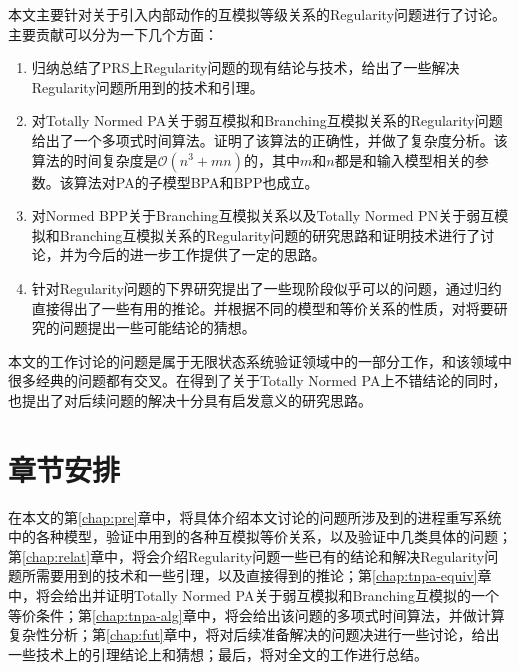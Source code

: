 本文主要针对关于引入内部动作的互模拟等级关系的Regularity问题进行了讨论。主要贡献可以分为一下几个方面：

\begin{enumerate}
	\item 归纳总结了PRS上Regularity问题的现有结论与技术，给出了一些解决Regularity问题所用到的技术和引理。
	\item 对Totally Normed PA关于弱互模拟和Branching互模拟关系的Regularity问题给出了一个多项式时间算法。证明了该算法的正确性，并做了复杂度分析。该算法的时间复杂度是$\mathscr{O}(n^3+mn)$的，其中$m$和$n$都是和输入模型相关的参数。该算法对PA的子模型BPA和BPP也成立。
	\item 对Normed BPP关于Branching互模拟关系以及Totally Normed PN关于弱互模拟和Branching互模拟关系的Regularity问题的研究思路和证明技术进行了讨论，并为今后的进一步工作提供了一定的思路。
	\item 针对Regularity问题的下界研究提出了一些现阶段似乎可以的问题，通过归约直接得出了一些有用的推论。并根据不同的模型和等价关系的性质，对将要研究的问题提出一些可能结论的猜想。
\end{enumerate}

本文的工作讨论的问题是属于无限状态系统验证领域中的一部分工作，和该领域中很多经典的问题都有交叉。在得到了关于Totally Normed PA上不错结论的同时，也提出了对后续问题的解决十分具有启发意义的研究思路。

\section{章节安排}
\label{sec:section}

在本文的第\ref{chap:pre}章中，将具体介绍本文讨论的问题所涉及到的进程重写系统中的各种模型，验证中用到的各种互模拟等价关系，以及验证中几类具体的问题；第\ref{chap:relat}章中，将会介绍Regularity问题一些已有的结论和解决Regularity问题所需要用到的技术和一些引理，以及直接得到的推论；第\ref{chap:tnpa-equiv}章中，将会给出并证明Totally Normed PA关于弱互模拟和Branching互模拟的一个等价条件；第\ref{chap:tnpa-alg}章中，将会给出该问题的多项式时间算法，并做计算复杂性分析；第\ref{chap:fut}章中，将对后续准备解决的问题决进行一些讨论，给出一些技术上的引理结论上和猜想；最后，将对全文的工作进行总结。
